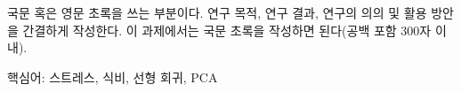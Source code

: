 국문 혹은 영문 초록을 쓰는 부분이다. 연구 목적, 연구 결과, 연구의 의의 및 활용 방안을 간결하게 작성한다. 이 과제에서는 국문 초록을 작성하면 된다(공백 포함 300자 이내).

\medskip
\noindent
핵심어: 스트레스, 식비, 선형 회귀, PCA